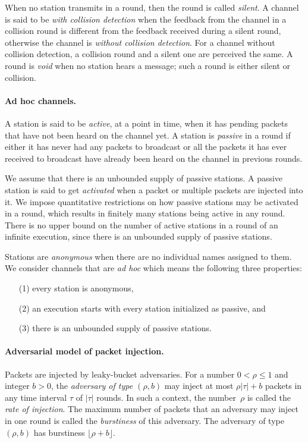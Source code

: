 \documentclass[11pt]{article}
\newcommand{\BBB}{\vspace*{-\bigskipamount}}
\newcommand{\Paragraph}[1]{\BBB\paragraph{#1}}
\begin{document}
When no station transmits in a round, then the round is called \emph{silent}.
A channel is said to be \emph{with collision detection} when the feedback from the channel in a collision round is different from the feedback received during a silent round,  otherwise the channel is \emph{without collision detection}. 
For a channel without collision detection, a collision round and a silent one are perceived  the same. 
A round is \emph{void} when no station hears a message; such a round is either silent or collision.


\Paragraph{Ad hoc channels.}


A station is said to be \emph{active}, at a point in time, when it has pending packets that have not been heard on the channel yet.
A station is  \emph{passive} in a round if either it has never had any packets to broadcast or all the packets it has ever received to broadcast have already been heard on the channel in previous rounds.

We assume that there is an unbounded supply of passive stations.
A passive station is said to get \emph{activated} when a packet or multiple packets are injected into it. 
We impose quantitative restrictions on how passive stations may be activated in a round, which results in finitely many stations being active in any round.
There is no upper bound on the number of active stations in a round of an infinite execution, since there is an unbounded supply of passive stations.


Stations are \emph{anonymous} when there are no individual names assigned to them.
We consider channels that are \emph{ad hoc} which means the following three properties: 
\begin{enumerate}
\item[(1)]
every station is anonymous, 
\item[(2)] 
an execution starts with every station initialized as passive, and 
\item[(3)] 
there is an unbounded supply of passive stations.
\end{enumerate}




\Paragraph{Adversarial model of packet injection.}





Packets are injected by leaky-bucket adversaries.
For a number $0<\rho\le 1$ and integer $b>0$, the \emph{adversary of  type $(\rho,b)$} may inject at most $\rho |\tau| + b$ packets in any time interval $\tau$ of $|\tau|$ rounds.
In such a context, the number~$\rho$ is called the \emph{rate of injection}.
The maximum number of packets that an adversary may inject in one round is called the \emph{burstiness} of this adversary.
The adversary of type $(\rho,b)$ has burstiness $\lfloor \rho + b\rfloor$.
\end{document}
